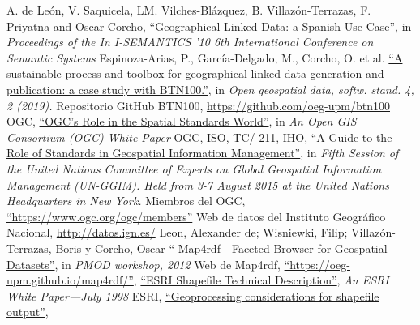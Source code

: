 \begin{thebibliography}{99}
    A. de Le{\'o}n, V. Saquicela, LM. Vilches-Bl{\'a}zquez, B. Villaz{\'o}n-Terrazas, F. Priyatna and Oscar Corcho,
        \href{http://oa.upm.es/6167/}{``Geographical Linked Data: a Spanish Use Case'',}
        in \textit{Proceedings of the In I-SEMANTICS '10  6th International Conference on Semantic Systems}
    Espinoza-Arias, P., García-Delgado, M., Corcho, O. et al.
        \href{https://doi.org/10.1186/s40965-019-0060-4}{``A sustainable process and toolbox for geographical linked data generation and publication: a case study with BTN100.''},
        in \textit{Open geospatial data, softw. stand. 4, 2 (2019).}
    Repositorio GitHub BTN100,
        \href{https://github.com/oeg-upm/btn100}{https://github.com/oeg-upm/btn100}
     OGC,
        \href{portal.opengeospatial.org/files/?artifact_id=6207&ei=haJwVY7ZOcfusAXb4oK4DA&usg=AFQjCNEKzXyIOXuYNii4cRrwGU6wfD4BgQ&sig2=41F6mU19BEdW_td2wCIrIQ&bvm=bv.94911696,d.b2w}{``OGC’s Role in the Spatial Standards World''},
        in \textit{An Open GIS Consortium (OGC) White Paper}
    OGC, ISO, TC/ 211, IHO,
        \href{http://ggim.un.org/meetings/GGIM-committee/8th-Session/documents/Standards_Guide_2018.pdf}{``A Guide to the Role of Standards in Geospatial Information Management''},
        in \textit{Fifth Session of the United Nations Committee of Experts on Global Geospatial Information Management (UN-GGIM). Held from 3-7 August 2015 at the United Nations Headquarters in New York.}
    Miembros del OGC,
        \href{https://www.ogc.org/ogc/members}{``https://www.ogc.org/ogc/members''}
     Web de datos del Instituto Geográfico Nacional,
        \href{http://datos.ign.es/}{http://datos.ign.es/}
     Leon, Alexander de; Wisniewki, Filip; Villazón-Terrazas, Boris y Corcho, Oscar
        \href{http://oa.upm.es/14511/}{`` Map4rdf - Faceted Browser for Geospatial Datasets''},
        in \textit{PMOD workshop, 2012}
    Web de Map4rdf,
        \href{https://oeg-upm.github.io/map4rdf/}{``https://oeg-upm.github.io/map4rdf/''},
        \href{https://support.esri.com/en/white-paper/279}{``ESRI Shapefile Technical Description''},
        \textit{An ESRI White Paper—July 1998}
     ESRI, 
        \href{http://webhelp.esri.com/arcgisdesktop/9.3/index.cfm?TopicName=Geoprocessing\%20considerations\%20for\%20shapefile\%20output}{``Geoprocessing considerations for shapefile output''},

\end{thebibliography}
